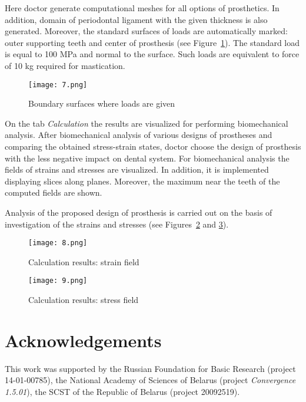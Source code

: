 \documentclass{elsarticle}
\begin{document}
Here doctor generate computational meshes for all options of
prosthetics. In addition, domain of periodontal ligament with the given
thickness is also generated. Moreover, the standard surfaces of loads
are automatically marked: outer supporting teeth and center of prosthesis
(see Figure~\ref{fig:7}). The standard load is equal to 100 MPa and
normal to the surface. Such loads are equivalent to force of 10 kg
required for mastication.
\begin{figure}[h]
  \centering
  \texttt{[image: 7.png]}
  \caption{Boundary surfaces where loads are given}
  \label{fig:7}
\end{figure}

On the tab \emph{Calculation} the results are visualized for performing
biomechanical analysis. After biomechanical analysis of various
designs of prostheses and comparing the obtained stress-strain states,
doctor choose the design of prosthesis with the less negative impact
on dental system. For biomechanical analysis the fields of strains and
stresses are visualized. In addition, it is implemented displaying
slices along planes. Moreover, the maximum near the teeth of the
computed fields are shown.

Analysis of the proposed design of prosthesis is carried out on the
basis of investigation of the strains and stresses (see
Figures~\ref{fig:8} and \ref{fig:9}). 
\begin{figure}[h]
  \centering
  \texttt{[image: 8.png]}
  \caption{Calculation results: strain field}
  \label{fig:8}
\end{figure}

\clearpage

\begin{figure}[h]
  \centering
  \texttt{[image: 9.png]}
  \caption{Calculation results: stress field}
  \label{fig:9}
\end{figure}

\section*{Acknowledgements}

This work was supported by the Russian Foundation for Basic Research
(project 14-01-00785), the National Academy of Sciences of Belarus
(project \emph{Convergence 1.5.01}), the SCST of the Republic of Belarus (project 20092519).




\end{document}
